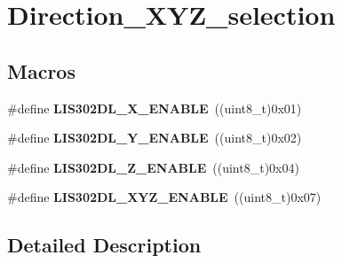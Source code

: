\hypertarget{group___direction___x_y_z__selection}{\section{Direction\-\_\-\-X\-Y\-Z\-\_\-selection}
\label{group___direction___x_y_z__selection}
}
\subsection*{Macros}
\begin{DoxyCompactItemize}
\item 
\hypertarget{group___direction___x_y_z__selection_ga7d57af50024150cfb24943a183ea7b03}{\#define {\bfseries L\-I\-S302\-D\-L\-\_\-\-X\-\_\-\-E\-N\-A\-B\-L\-E}~((uint8\-\_\-t)0x01)}\label{group___direction___x_y_z__selection_ga7d57af50024150cfb24943a183ea7b03}

\item 
\hypertarget{group___direction___x_y_z__selection_gab7717f2ae509cb6f9a03064b407e36d9}{\#define {\bfseries L\-I\-S302\-D\-L\-\_\-\-Y\-\_\-\-E\-N\-A\-B\-L\-E}~((uint8\-\_\-t)0x02)}\label{group___direction___x_y_z__selection_gab7717f2ae509cb6f9a03064b407e36d9}

\item 
\hypertarget{group___direction___x_y_z__selection_ga180837b239a012f7d63a37295a45ea4e}{\#define {\bfseries L\-I\-S302\-D\-L\-\_\-\-Z\-\_\-\-E\-N\-A\-B\-L\-E}~((uint8\-\_\-t)0x04)}\label{group___direction___x_y_z__selection_ga180837b239a012f7d63a37295a45ea4e}

\item 
\hypertarget{group___direction___x_y_z__selection_ga109bfc90bece91ba0658d641775f2fc2}{\#define {\bfseries L\-I\-S302\-D\-L\-\_\-\-X\-Y\-Z\-\_\-\-E\-N\-A\-B\-L\-E}~((uint8\-\_\-t)0x07)}\label{group___direction___x_y_z__selection_ga109bfc90bece91ba0658d641775f2fc2}

\end{DoxyCompactItemize}


\subsection{Detailed Description}
